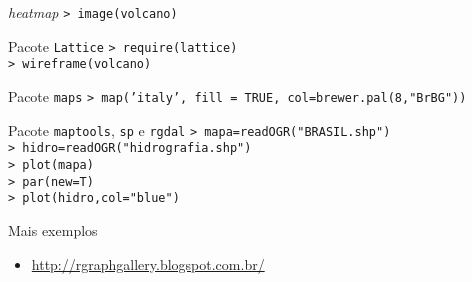 \documentclass{beamer}
\begin{document}
\begin{frame}{\textit{heatmap}}
  \texttt{> image(volcano)}
  \begin{center}
    \end{center}

\end{frame}

\begin{frame}{Pacote \texttt{Lattice}}
   \texttt{> require(lattice)\\
> wireframe(volcano)}
  \begin{center}
    \end{center}
\end{frame}

\begin{frame}{Pacote \texttt{maps}}
\texttt{> map('italy', fill = TRUE, col=brewer.pal(8,"BrBG"))}
\begin{center}
   
\end{center}
\end{frame}

\begin{frame}{Pacote \texttt{maptools}, \texttt{sp} e \texttt{rgdal}}
\texttt{> mapa=readOGR("BRASIL.shp")\\
> hidro=readOGR("hidrografia.shp")\\
> plot(mapa)\\
> par(new=T)\\
> plot(hidro,col="blue")}
\begin{center}
   
\end{center}
\end{frame}



\begin{frame}{Mais exemplos}
  \begin{itemize}
  \item \url{http://rgraphgallery.blogspot.com.br/}
  \end{itemize}

  
\end{frame}
\end{document}
